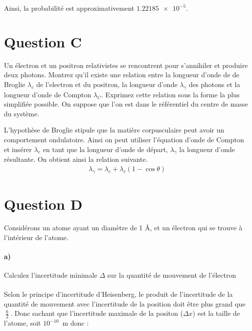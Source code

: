 \documentclass[11pt, letterpaper]{article}
\begin{document}
\begin{tcolorbox}
    Ainsi, la probabilité est approximativement $\num{1.22185e-5}$.
\end{tcolorbox}

\vspace{1cm}

\section*{Question C} Un électron et un positron relativistes se rencontrent pour s'annihiler et produire deux photons. Montrez qu'il existe une relation entre la longueur d'onde de de Broglie $\lambda_e$ de l'electron
et du positron, la longueur d'onde $\lambda_\gamma$ des photons et la longueur d'onde de Compton $\lambda_C$.
Exprimez cette relation sous la forme la plus simplifiée possible. On suppose que l'on est
dans le référentiel du centre de masse du système.

\begin{tcolorbox}[tommy]
    L'hypothèse de Broglie stipule que la matière corpusculaire peut avoir un comportement ondulatoire. Ainsi on peut utiliser l'équation d'onde de Compton et insérer $\lambda_e$ en tant que la longueur d'onde de départ, $\lambda_\gamma$ la longueur d'onde résultante. On obtient ainsi la relation suivante.
    \begin{align*}
        \lambda_\gamma = \lambda_e + \lambda_c(1-\cos \theta)
    \end{align*}
\end{tcolorbox}


\section*{Question D}
Considérons un atome ayant un diamètre de 1 Å, et un électron qui se trouve à l'intérieur de
l'atome. 
\paragraph*{a)} Calculez l'incertitude minimale $\Delta$ sur la quantité de mouvement de l'électron \\\\
Selon le principe d'incertitude d'Heisenberg, le produit de l'incertitude de la quantité de mouvement avec l'incertitude de la position doit être plus grand que $\frac{\hslash}{2}$. Donc sachant que l'incertitude maximale de la positon ($\Delta x$) est la taille de l'atome, soit $10^{-10}$\, m donc :
\end{document}
